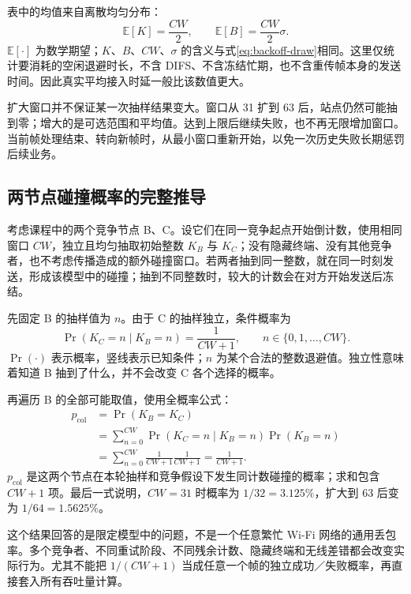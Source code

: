 表中的均值来自离散均匀分布：
\begin{equation}
\mathbb{E}[K]=\frac{CW}{2},\qquad
\mathbb{E}[B]=\frac{CW}{2}\sigma.
\label{eq:mean-backoff}
\end{equation}
$\mathbb{E}[\cdot]$ 为数学期望；$K$、$B$、$CW$、$\sigma$ 的含义与式\eqref{eq:backoff-draw}相同。这里仅统计要消耗的空闲退避时长，不含 DIFS、不含冻结忙期，也不含重传帧本身的发送时间。因此真实平均接入时延一般比该数值更大。

扩大窗口并不保证某一次抽样结果变大。窗口从 31 扩到 63 后，站点仍然可能抽到零；增大的是可选范围和平均值。达到上限后继续失败，也不再无限增加窗口。当前帧处理结束、转向新帧时，从最小窗口重新开始，以免一次历史失败长期惩罚后续业务。

\subsection{两节点碰撞概率的完整推导}

考虑课程中的两个竞争节点 B、C。设它们在同一竞争起点开始倒计数，使用相同窗口 $CW$，独立且均匀抽取初始整数 $K_B$ 与 $K_C$；没有隐藏终端、没有其他竞争者，也不考虑传播造成的额外碰撞窗口。若两者抽到同一整数，就在同一时刻发送，形成该模型中的碰撞；抽到不同整数时，较大的计数会在对方开始发送后冻结。

先固定 B 的抽样值为 $n$。由于 C 的抽样独立，条件概率为
\begin{equation}
\Pr(K_C=n\mid K_B=n)=\frac{1}{CW+1},
\qquad n\in\{0,1,\ldots,CW\}.
\label{eq:collision-conditional}
\end{equation}
$\Pr(\cdot)$ 表示概率，竖线表示已知条件；$n$ 为某个合法的整数退避值。独立性意味着知道 B 抽到了什么，并不会改变 C 各个选择的概率。

再遍历 B 的全部可能取值，使用全概率公式：
\begin{align}
p_{\mathrm{col}}
&=\Pr(K_B=K_C)\\
&=\sum_{n=0}^{CW}\Pr(K_C=n\mid K_B=n)\Pr(K_B=n)\\
&=\sum_{n=0}^{CW}\frac{1}{CW+1}\frac{1}{CW+1}
=\frac{1}{CW+1}.
\label{eq:two-node-collision}
\end{align}
$p_{\mathrm{col}}$ 是这两个节点在本轮抽样和竞争假设下发生同计数碰撞的概率；求和包含 $CW+1$ 项。最后一式说明，$CW=31$ 时概率为 $1/32=3.125\%$，扩大到 63 后变为 $1/64=1.5625\%$。

这个结果回答的是限定模型中的问题，不是一个任意繁忙 Wi-Fi 网络的通用丢包率。多个竞争者、不同重试阶段、不同残余计数、隐藏终端和无线差错都会改变实际行为。尤其不能把 $1/(CW+1)$ 当成任意一个帧的独立成功／失败概率，再直接套入所有吞吐量计算。

